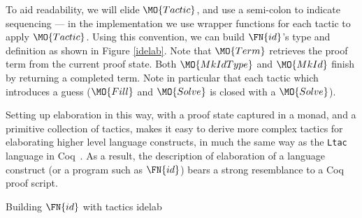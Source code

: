 To aid readability, we will elide $\MO{Tactic}$, and use a semi-colon to indicate
sequencing --- in the implementation we use wrapper functions for each tactic to
apply $\MO{Tactic}$.
Using this convention, we can build $\FN{id}$'s type and definition as shown
in Figure \ref{idelab}. Note that $\MO{Term}$ retrieves the proof term from the current proof
state. Both $\MO{MkIdType}$ and $\MO{MkId}$ finish by returning a completed \TT{} term.
Note in particular that each tactic which introduces a guess ($\MO{Fill}$ 
and $\MO{Solve}$ is closed with a $\MO{Solve}$).

Setting up elaboration in this way, with a proof state captured in a monad,
and a primitive collection of tactics, makes it easy to derive more complex
tactics for elaborating higher level language constructs, in much the same way
as the \texttt{Ltac} language in Coq~\cite{Delahaye2000}. As a result, the
description of elaboration of a language construct (or a program such as
$\FN{id}$) bears a strong resemblance to
a Coq proof script.

{Building $\FN{id}$ with tactics}
{idelab}


                             

